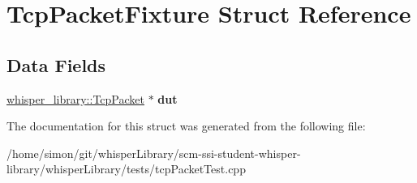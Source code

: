 \hypertarget{structTcpPacketFixture}{\section{\-Tcp\-Packet\-Fixture \-Struct \-Reference}
\label{structTcpPacketFixture}
}
\subsection*{\-Data \-Fields}
\begin{DoxyCompactItemize}
\item 
\hypertarget{structTcpPacketFixture_a0ac6ed01ea26ddb7cac186f8c56d6e42}{\hyperlink{classwhisper__library_1_1TcpPacket}{whisper\-\_\-library\-::\-Tcp\-Packet} $\ast$ {\bfseries dut}}\label{structTcpPacketFixture_a0ac6ed01ea26ddb7cac186f8c56d6e42}

\end{DoxyCompactItemize}


\-The documentation for this struct was generated from the following file\-:\begin{DoxyCompactItemize}
\item 
/home/simon/git/whisper\-Library/scm-\/ssi-\/student-\/whisper-\/library/whisper\-Library/tests/tcp\-Packet\-Test.\-cpp\end{DoxyCompactItemize}
